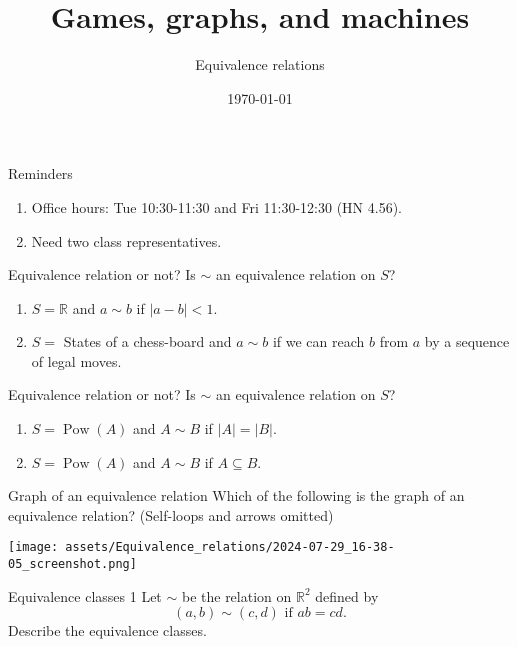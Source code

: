 \documentclass[t, 10pt]{beamer}
\date{\today}
\title{Games, graphs, and machines}
\subtitle{Equivalence relations}
\renewcommand{\mathbf}{\mathbb}
\begin{document}
\maketitle
\begin{frame}[label={sec:org475a188}]{Reminders}
\begin{enumerate}
\item Office hours: Tue 10:30-11:30 and Fri 11:30-12:30 (HN 4.56).
\item Need two class representatives.
\end{enumerate}
\end{frame}
\begin{frame}[label={sec:orgf29566c}]{Equivalence relation or not?}
Is \(\sim\) an equivalence relation on \(S\)?

\begin{enumerate}
\item \(S = \mathbf{R}\) and \(a \sim b\) if \(|a-b| < 1\).
\item \(S =\) States of a chess-board and \(a \sim b\) if we can reach \(b\) from \(a\) by a sequence of legal moves.
\end{enumerate}
\end{frame}
\begin{frame}[label={sec:org668c0ac}]{Equivalence relation or not?}
Is \(\sim\) an equivalence relation on \(S\)?

\begin{enumerate}
\item \(S = \operatorname{Pow}(A)\) and \(A \sim B\) if \(|A| = |B|\).

\item \(S = \operatorname{Pow}(A)\) and \(A \sim B\) if \(A \subseteq B\).
\end{enumerate}
\end{frame}
\begin{frame}[label={sec:org5377ae6}]{Graph of an equivalence relation}
Which of the following is the graph of an equivalence relation?
(Self-loops and arrows omitted)

\begin{center}
\texttt{[image: assets/Equivalence\_relations/2024-07-29\_16-38-05\_screenshot.png]}
\end{center}
\end{frame}
\begin{frame}[label={sec:org9fd0b08}]{Equivalence classes 1}
Let \(\sim\) be the relation on \(\mathbf{R}^2\) defined by
\[ (a,b) \sim (c,d) \text{ if } ab = cd.\]
Describe the equivalence classes.
\end{frame}
\end{document}
